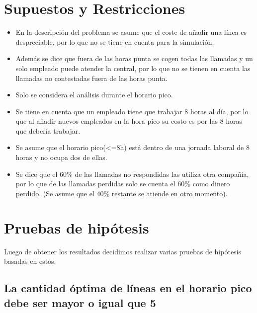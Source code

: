 \documentclass{article}
\begin{document}
\section{Supuestos y Restricciones}
\begin{itemize}
    \item En la descripción del problema se asume que el coste de añadir una línea es despreciable, por lo que no se tiene en cuenta para la simulación.
    \item Además se dice que fuera de las horas punta se cogen todas las llamadas y un solo empleado puede atender la central, por lo que no se tienen en cuenta las llamadas no contestadas fuera de las horas punta. 
    \item Solo se considera el análisis durante el horario pico.
    \item Se tiene en cuenta que un empleado tiene que trabajar 8 horas al día, por lo que al añadir nuevos empleados en la hora pico su costo es por las 8 horas que debería trabajar.
    \item Se asume que el horario pico(<=8h) está dentro de una jornada laboral de 8 horas y no ocupa dos de ellas.
    \item Se dice que el 60\% de las llamadas no respondidas las utiliza otra compañía, por lo que de las llamadas perdidas solo se cuenta el 60\% como dinero perdido. (Se asume que el 40\% restante se atiende en otro momento).
\end{itemize}

\section{Pruebas de hipótesis}
Luego de obtener los resultados decidimos realizar varias pruebas de hipótesis basadas en estos.

\subsection{La cantidad óptima de líneas en el horario pico debe ser mayor o igual que 5}
\end{document}

